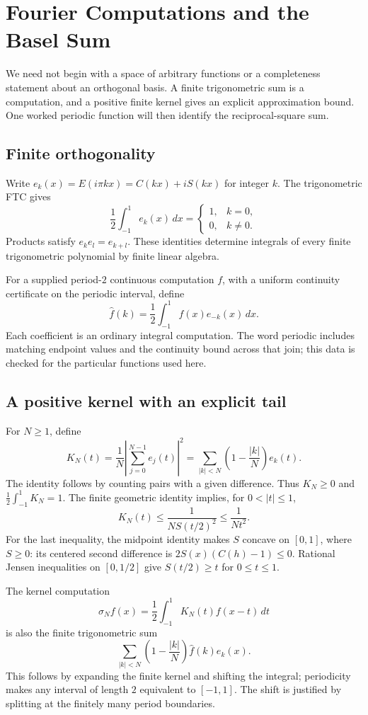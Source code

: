 \chapter{Fourier Computations and the Basel Sum}\label{ch:fourier}

We need not begin with a space of arbitrary functions or a completeness
statement about an orthogonal basis.  A finite trigonometric sum is a
computation, and a positive finite kernel gives an explicit approximation
bound.  One worked periodic function will then identify the reciprocal-square
sum.

\section{Finite orthogonality}
Write $e_k(x)=E(i\pi kx)=C(kx)+iS(kx)$ for integer $k$.  The trigonometric
FTC gives
\[
 \frac12\int_{-1}^1 e_k(x)\,dx
 =\begin{cases}1,&k=0,\\0,&k\ne0.\end{cases}
\]
Products satisfy $e_ke_l=e_{k+l}$.  These identities determine integrals
of every finite trigonometric polynomial by finite linear algebra.

For a supplied period-$2$ continuous computation $f$, with a uniform
continuity certificate on the periodic interval, define
\[
 \widehat f(k)=\frac12\int_{-1}^1f(x)e_{-k}(x)\,dx.
\]
Each coefficient is an ordinary integral computation.  The word periodic
includes matching endpoint values and the continuity bound across that
join; this data is checked for the particular functions used here.

\section{A positive kernel with an explicit tail}
For $N\ge1$, define
\[
 K_N(t)=\frac1N\left|\sum_{j=0}^{N-1}e_j(t)\right|^2
       =\sum_{|k|<N}\left(1-\frac{|k|}{N}\right)e_k(t).
\]
The identity follows by counting pairs with a given difference.  Thus
$K_N\ge0$ and $\frac12\int_{-1}^1K_N=1$.
The finite geometric identity implies, for $0<|t|\le1$,
\[
 K_N(t)\le\frac1{N S(t/2)^2}\le\frac1{Nt^2}.
\]
For the last inequality, the midpoint identity makes $S$ concave on
$[0,1]$, where $S\ge0$: its centered second difference is
$2S(x)(C(h)-1)\le0$.  Rational Jensen inequalities on $[0,1/2]$ give
$S(t/2)\ge t$ for $0\le t\le1$.

The kernel computation
\[
 \sigma_N f(x)=\frac12\int_{-1}^1K_N(t)f(x-t)\,dt
\]
is also the finite trigonometric sum
\[
 \sum_{|k|<N}\left(1-\frac{|k|}{N}\right)\widehat f(k)e_k(x).
\]
This follows by expanding the finite kernel and shifting the integral;
periodicity makes any interval of length $2$ equivalent to $[-1,1]$.
The shift is justified by splitting at the finitely many period boundaries.

